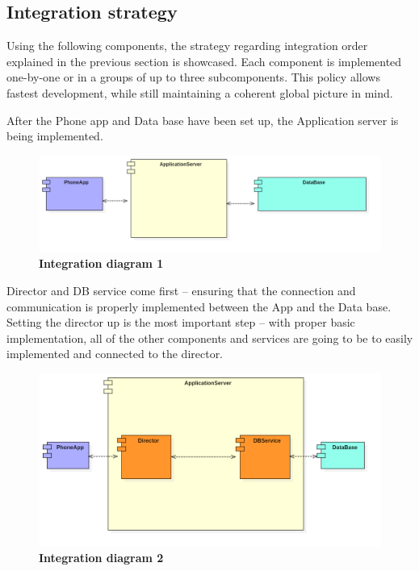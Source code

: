 \subsection{Integration strategy}

Using the following components, the strategy regarding integration order explained in the previous section is showcased. Each component is implemented one-by-one or in a groups of up to three subcomponents. This policy allows fastest development, while still maintaining a coherent global picture in mind. 

 
After the Phone app and Data base have been set up, the Application server is being implemented. 

 
\begin{figure}[!h]
\centering
\includegraphics[width=\textwidth]{Images/IntegrationDiagram1}
\caption{\label{fig:imp1}\textbf{Integration diagram 1}}
\end{figure}
 

Director and DB service come first – ensuring that the connection and communication is properly implemented between the App and the Data base. Setting the director up is the most important step – with proper basic implementation, all of the other components and services are going to be to easily implemented and connected to the director.  

 

\begin{figure}[!h]
\centering
\includegraphics[width=\textwidth]{Images/IntegrationDiagram2}
\caption{\label{fig:imp2}\textbf{Integration diagram 2}}
\end{figure}

